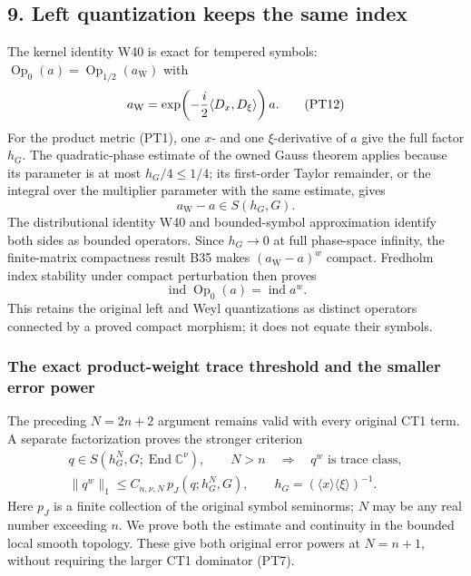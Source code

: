 \documentclass[
  11pt,
]{article}
\begin{document}
\subsection{9. Left quantization keeps the same
index}\label{left-quantization-keeps-the-same-index}

The kernel identity W40 is exact for tempered symbols:
\(\operatorname{Op}_0(a)=\operatorname{Op}_{1/2}(a_{\mathrm W})\) with
\[
 a_{\mathrm W}
  =\exp\!\left(-{i\over2}\langle D_x,D_\xi\rangle\right)a .
 \tag{PT12}
\] For the product metric (PT1), one \(x\)- and one \(\xi\)-derivative
of \(a\) give the full factor \(h_G\). The quadratic-phase estimate of
the owned Gauss theorem applies because its parameter is at most
\(h_G/4\le1/4\); its first-order Taylor remainder, or the integral over
the multiplier parameter with the same estimate, gives \[
 a_{\mathrm W}-a\in S(h_G,G).
 \tag{PT13}
\] The distributional identity W40 and bounded-symbol approximation
identify both sides as bounded operators. Since \(h_G\to0\) at full
phase-space infinity, the finite-matrix compactness result B35 makes
\((a_{\mathrm W}-a)^w\) compact. Fredholm index stability under compact
perturbation then proves \[
 \operatorname{ind}\operatorname{Op}_0(a)
       =\operatorname{ind}a^w .
 \tag{PT14}
\] This retains the original left and Weyl quantizations as distinct
operators connected by a proved compact morphism; it does not equate
their symbols.

\subsubsection{The exact product-weight trace threshold and the smaller
error
power}\label{the-exact-product-weight-trace-threshold-and-the-smaller-error-power}

The preceding \(N=2n+2\) argument remains valid with every original CT1
term. A separate factorization proves the stronger criterion \[
 \begin{gathered}
 q\in S(h_G^N,G;\operatorname{End}\mathbb C^\nu),\qquad N>n
 \quad\Longrightarrow\quad q^w\text{ is trace class},\\
 \|q^w\|_1\leq C_{n,\nu,N}\,p_J(q;h_G^N,G),
 \qquad h_G=(\langle x\rangle\langle\xi\rangle)^{-1}.
 \end{gathered}                                                   \tag{PT15}
\] Here \(p_J\) is a finite collection of the original symbol seminorms;
\(N\) may be any real number exceeding \(n\). We prove both the estimate
and continuity in the bounded local smooth topology. These give both
original error powers at \(N=n+1\), without requiring the larger CT1
dominator (PT7).
\end{document}

